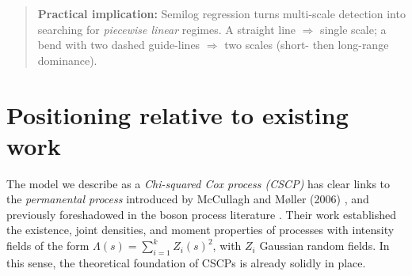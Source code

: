 \documentclass[11pt]{article}
\begin{document}
\begin{quote}
\begin{center}
	\end{center}
	
	\noindent\textbf{Practical implication:}  
	Semilog regression turns multi-scale detection into searching for \emph{piecewise linear} regimes.  
	A straight line $\Rightarrow$ single scale; a bend with two dashed guide-lines $\Rightarrow$ two scales (short- then long-range dominance).
\end{quote}

\section{Positioning relative to existing work}

The model we describe as a \emph{Chi-squared Cox process (CSCP)} has clear 
links to the \emph{permanental process} introduced by McCullagh and M{\o}ller (2006) \cite{McCullaghMoller2006}, 
and previously foreshadowed in the boson process literature 
\cite{ShiraiTakahashi2003}. 
Their work established the existence, joint densities, and moment properties of 
processes with intensity fields of the form 
$\Lambda(s)=\sum_{i=1}^k Z_i(s)^2$, 
with $Z_i$ Gaussian random fields. In this sense, the theoretical foundation of CSCPs 
is already solidly in place.
\end{document}
